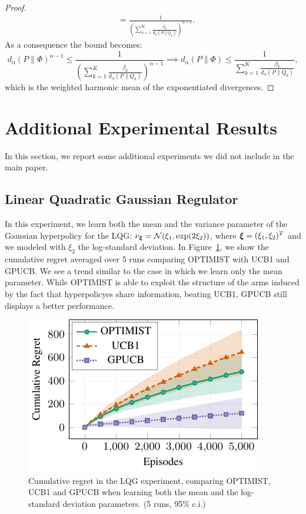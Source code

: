 \documentclass{article}
\makeatletter
\DeclareRobustCommand{\algoname}{OPTIMIST\@\xspace}
\makeatother
\begin{document}
\begin{proof}
\begin{align*}
        & = \frac{1} {\left(\sum_{k=1}^K \frac{ \beta_k}{ d_{\alpha}(P \| Q_k)}\right)^{\alpha-1}}.
    \end{align*}
    As a consequence the bound becomes:
    \begin{equation*}
        d_{\alpha}(P \| \Phi)^{\alpha-1} \le  \frac{1} {\left(\sum_{k=1}^K \frac{\beta_k}{ d_{\alpha}(P \| Q_k)}\right)^{\alpha-1}} \implies  d_{\alpha}(P \| \Phi) \le \frac{1} {\sum_{k=1}^K \frac{ \beta_k}{ d_{\alpha}(P \| Q_k)}},
    \end{equation*}
    which is the weighted harmonic mean of the exponentiated divergences.
\end{proof}

\section{Additional Experimental Results}
\label{apx:additionalExperiments}
In this section, we report some additional experiments we did not include in the main paper.

\subsection{Linear Quadratic Gaussian Regulator}
\label{apx:expLQG}
In this experiment, we learn both the mean and the variance parameter of the Gaussian hyperpolicy
for the LQG: $\nu_{\boldsymbol{\xi}} = \mathcal{N}(\xi_1, \exp(2\xi_2))$, where $\boldsymbol{\xi}=(\xi_1,\xi_2)^T$ and we modeled with $\xi_2$ the log-standard deviation. In Figure~\ref{fig:lqgVar}, we show the cumulative regret averaged over 5 runs comparing \algoname with UCB1 and GPUCB. We see a
trend similar to the case in which we learn only the mean parameter. While \algoname is able to exploit
the structure of the arms induced by the fact that hyperpolicyes share information, beating UCB1, GPUCB still displays a better performance.
\begin{figure}[h!] 
\vskip 0.2in
    \centering
    \includegraphics[width=0.4\linewidth]{plots/lqg_mu_sigma/plot.pdf}
    \caption{Cumulative regret in the LQG experiment, comparing \algoname, UCB1 and GPUCB  when learning both the mean and the log-standard deviation parameters. (5 runs, 95\% c.i.)} 
    \label{fig:lqgVar} 
  \vskip -0.2in
\end{figure}
\end{document}

